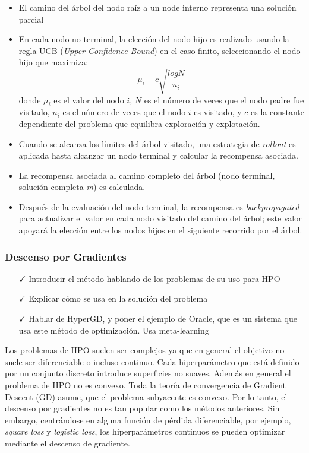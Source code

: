 \begin{itemize}
	\item El camino del árbol del nodo raíz a un node interno representa una solución parcial
	\item  En cada nodo no-terminal, la elección del nodo hijo es realizado usando la regla UCB (\textit{Upper Confidence Bound}) en el caso finito, seleccionando el nodo hijo que maximiza: 
	$$
	 \mu_i + c\sqrt{\frac{logN}{n_i}}
	$$
	donde $\mu_i$  es el valor del nodo $i$, $N$ es el número de veces que el nodo padre fue visitado, $n_i$ es el número de veces que el nodo $i$ es visitado, y $c$ es la constante dependiente del problema que equilibra exploración y explotación.
	\item Cuando se alcanza los límites del árbol visitado, una estrategia de \textit{rollout} es aplicada hasta alcanzar un nodo terminal y calcular la recompensa asociada.
	\item La recompensa asociada al camino completo del árbol (nodo terminal, solución completa \textit{m}) es calculada.
	\item Después de la evaluación del nodo terminal, la recompensa es \textit{backpropagated} para actualizar el valor en cada nodo visitado del camino del árbol; este valor apoyará la elección entre los nodos hijos en el siguiente recorrido por el árbol.
\end{itemize}

\subsubsection{Descenso por Gradientes}

\begin{itemize}
	\item[$\checkmark$] Introducir el método hablando de los problemas de su uso para HPO
	\item[$\checkmark$] Explicar cómo se usa en la solución del problema
	\item[$\checkmark$] Hablar de HyperGD, y poner el ejemplo de Oracle, que es un sistema que usa este método de optimización. Usa meta-learning
\end{itemize}

Los problemas de HPO suelen ser complejos ya que en general el objetivo no suele ser diferenciable o incluso continuo. Cada hiperparámetro que está definido por un conjunto discreto introduce superficies no suaves. Además en general el problema de HPO no es convexo. Toda la teoría de convergencia de Gradient Descent  (GD) asume, que el problema subyacente es convexo. Por lo tanto, el descenso por gradientes no es tan popular como los métodos anteriores. Sin embargo, centrándose en alguna función de pérdida diferenciable, por ejemplo, \textit{square loss} y \textit{logistic loss}, los hiperparámetros continuos se pueden optimizar mediante el descenso de gradiente.

